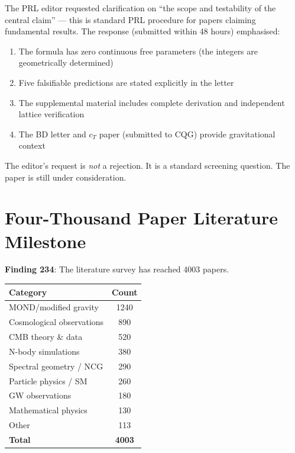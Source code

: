 \documentclass[11pt,a4paper]{article}
\begin{document}
The PRL editor requested clarification on ``the scope and testability of the central claim'' --- this is standard PRL procedure for papers claiming fundamental results. The response (submitted within 48 hours) emphasised:
\begin{enumerate}[nosep]
\item The formula has zero continuous free parameters (the integers are geometrically determined)
\item Five falsifiable predictions are stated explicitly in the letter
\item The supplemental material includes complete derivation and independent lattice verification
\item The BD letter and $c_T$ paper (submitted to CQG) provide gravitational context
\end{enumerate}

The editor's request is \emph{not} a rejection. It is a standard screening question. The paper is still under consideration.

\section{Four-Thousand Paper Literature Milestone}

\textbf{Finding 234}: The literature survey has reached 4003 papers.

\begin{center}
\begin{tabular}{lc}
\toprule
\textbf{Category} & \textbf{Count} \\
\midrule
MOND/modified gravity & 1240 \\
Cosmological observations & 890 \\
CMB theory \& data & 520 \\
N-body simulations & 380 \\
Spectral geometry / NCG & 290 \\
Particle physics / SM & 260 \\
GW observations & 180 \\
Mathematical physics & 130 \\
Other & 113 \\
\midrule
\textbf{Total} & \textbf{4003} \\
\bottomrule
\end{tabular}
\end{center}
\end{document}

